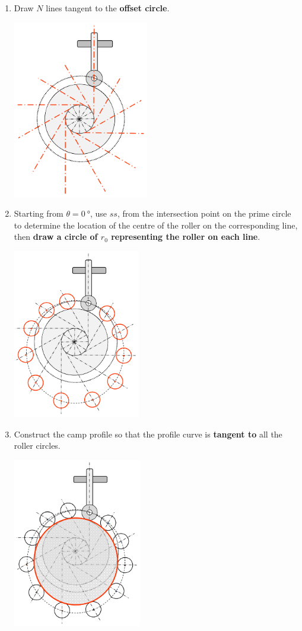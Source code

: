 \documentclass[11pt]{article}
\begin{document}
\begin{enumerate}
\begin{center}
\end{center}
\item Draw \(N\) lines tangent to the \textbf{offset circle}.
\begin{center}
\includegraphics[height=21em]{./images/roller-follower-with-offset-tangent-to-offset-circle.png}
\end{center}
\item Starting from \(\theta = \qty{0}{\degree}\), use \(ss\), from the intersection point on the prime circle to determine the location of the centre of the roller on the corresponding line, then \textbf{draw a circle of \(r_0\) representing the roller on each line}.
\begin{center}
\includegraphics[height=20em]{./images/roller-follower-with-offset-roller-circle.png}
\end{center}
\item Construct the camp profile so that the profile curve is \textbf{tangent to} all the roller circles.
\begin{center}
\includegraphics[height=20em]{./images/roller-follower-with-offset-cam-profile.png}

\end{center}
\end{enumerate}
\end{document}
